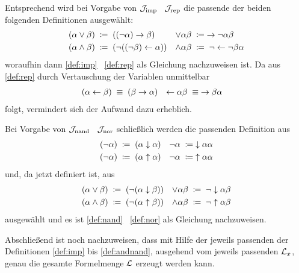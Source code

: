 Entsprechend wird bei Vorgabe von $\mathcal{J}_{\mathrm{imp}}$ \textbzgl\ $\mathcal{J}_{\mathrm{rep}}$ die passende der beiden folgenden Definitionen ausgewählt:
\begin{align}
	(\alpha \lor  \beta) & \;\coloneqq\; ((\lnot \alpha) \rightarrow \beta)         &
	\lor \alpha   \beta  & \;\coloneqq\;   \rightarrow \lnot \alpha \beta
	\label{def:orrep}
	\\
	(\alpha \land \beta) & \;\coloneqq\; (\lnot ((\lnot \beta) \leftarrow \alpha)) &
	\land \alpha  \beta  & \;\coloneqq\;  \lnot \leftarrow \lnot \beta \alpha
	\label{def:andrep}
\end{align}
woraufhin dann \eqref{def:imp} \textbzgl\ \eqref{def:rep} als Gleichung nachzuweisen ist.
Da aus \eqref{def:rep} durch Vertauschung der Variablen unmittelbar
\begin{align}
	(\alpha \leftarrow \beta) & \;\equiv\; (\beta \rightarrow \alpha) &
	\leftarrow \alpha  \beta  & \;\equiv\;  \rightarrow \beta \alpha  \label{eq:repimp}
\end{align}
folgt, vermindert sich der Aufwand dazu erheblich.

Bei Vorgabe von $\mathcal{J}_{\mathrm{nand}}$ \textbzgl\ $\mathcal{J}_{\mathrm{nor}}$ schließlich werden die passenden Definition aus
\begin{align}
	(\lnot \alpha) & \;\coloneqq\; (\alpha \downarrow \alpha)  &
	\lnot  \alpha  & \;\coloneqq\;  \downarrow \alpha \alpha   \label{def:notnor} \\
	(\lnot \alpha) & \;\coloneqq\; (\alpha \uparrow \alpha) &
	\lnot  \alpha  & \;\coloneqq\;  \uparrow \alpha \alpha  \label{def:notnand}
\end{align}
und, da \symqt{\lnot} jetzt definiert ist, aus
\begin{align}
	(\alpha \lor \beta)  & \;\coloneqq\; (\lnot(\alpha \downarrow \beta))  &
	\lor \alpha  \beta   & \;\coloneqq\;  \lnot \downarrow \alpha \beta
	\label{def:ornor} \\
	(\alpha \land \beta) & \;\coloneqq\; (\lnot(\alpha \uparrow \beta)) &
	\land \alpha  \beta  & \;\coloneqq\;  \lnot \uparrow \alpha \beta
	\label{def:andnand}
\end{align}
ausgewählt und es ist \eqref{def:nand} \textbzgl\ \eqref{def:nor} als Gleichung nachzuweisen.

Abschließend ist noch nachzuweisen, dass mit Hilfe der jeweils passenden der Definitionen \eqref{def:imp} bis \eqref{def:andnand}, ausgehend vom jeweils passenden $\mathcal{L}_x$, genau die gesamte Formelmenge $\mathcal{L}$ erzeugt werden kann.

